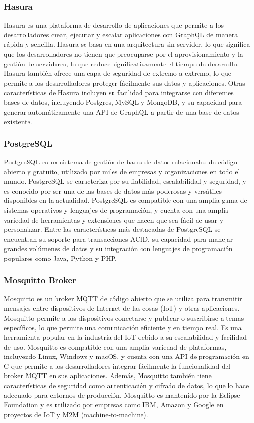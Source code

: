 \newpage
\subsubsection{Hasura}

Hasura es una plataforma de desarrollo de aplicaciones que permite a los desarrolladores crear, ejecutar y escalar aplicaciones con GraphQL de manera rápida y sencilla. Hasura se basa en una arquitectura sin servidor, lo que significa que los desarrolladores no tienen que preocuparse por el aprovisionamiento y la gestión de servidores, lo que reduce significativamente el tiempo de desarrollo. Hasura también ofrece una capa de seguridad de extremo a extremo, lo que permite a los desarrolladores proteger fácilmente sus datos y aplicaciones. Otras características de Hasura incluyen su facilidad para integrarse con diferentes bases de datos, incluyendo Postgres, MySQL y MongoDB, y su capacidad para generar automáticamente una API de GraphQL a partir de una base de datos existente. 


\subsubsection{PostgreSQL}

PostgreSQL es un sistema de gestión de bases de datos relacionales de código abierto y gratuito, utilizado por miles de empresas y organizaciones en todo el mundo. PostgreSQL se caracteriza por su fiabilidad, escalabilidad y seguridad, y es conocido por ser una de las bases de datos más poderosas y versátiles disponibles en la actualidad. PostgreSQL es compatible con una amplia gama de sistemas operativos y lenguajes de programación, y cuenta con una amplia variedad de herramientas y extensiones que hacen que sea fácil de usar y personalizar. Entre las características más destacadas de PostgreSQL se encuentran su soporte para transacciones ACID, su capacidad para manejar grandes volúmenes de datos y su integración con lenguajes de programación populares como Java, Python y PHP. 


\subsubsection{Mosquitto Broker}

Mosquitto es un broker MQTT de código abierto que se utiliza para transmitir mensajes entre dispositivos de Internet de las cosas (IoT) y otras aplicaciones. Mosquitto permite a los dispositivos conectarse y publicar o suscribirse a temas específicos, lo que permite una comunicación eficiente y en tiempo real. Es una herramienta popular en la industria del IoT debido a su escalabilidad y facilidad de uso. Mosquitto es compatible con una amplia variedad de plataformas, incluyendo Linux, Windows y macOS, y cuenta con una API de programación en C que permite a los desarrolladores integrar fácilmente la funcionalidad del broker MQTT en sus aplicaciones. Además, Mosquitto también tiene características de seguridad como autenticación y cifrado de datos, lo que lo hace adecuado para entornos de producción. Mosquitto es mantenido por la Eclipse Foundation y es utilizado por empresas como IBM, Amazon y Google en proyectos de IoT y M2M (machine-to-machine).


